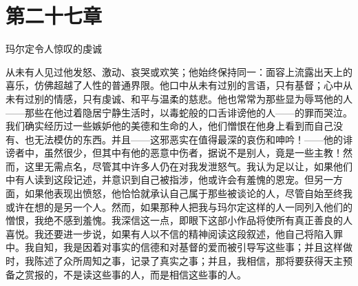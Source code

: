 
\section{第二十七章}

玛尔定令人惊叹的虔诚\par

从未有人见过他发怒、激动、哀哭或欢笑；他始终保持同一：面容上流露出天上的喜乐，仿佛超越了人性的普通界限。他口中从未有过别的言语，只有基督；心中从未有过别的情感，只有虔诚、和平与温柔的慈悲。他也常常为那些显为辱骂他的人——那些在他过着隐居宁静生活时，以毒蛇般的口舌诽谤他的人——的罪而哭泣。我们确实经历过一些嫉妒他的美德和生命的人，他们憎恨在他身上看到而自己没有、也无法模仿的东西。并且——这邪恶实在值得最深的哀伤和呻吟！——他的诽谤者中，虽然很少，但其中有他的恶意中伤者，据说不是别人，竟是一些主教！然而，这里无需点名，尽管其中许多人仍在对我发泄怒气。我认为足以让，如果他们中有人读到这段记述，并意识到自己被指涉，他或许会有羞愧的恩宠。但另一方面，如果他表现出愤怒，他恰恰就承认自己属于那些被谈论的人，尽管自始至终我或许在想的是另一个人。然而，如果那种人把我与玛尔定这样的人一同列入他们的憎恨，我绝不感到羞愧。我深信这一点，即眼下这部小作品将使所有真正善良的人喜悦。我还要进一步说，如果有人以不信的精神阅读这段叙述，他自己将陷入罪中。我自知，我是因着对事实的信德和对基督的爱而被引导写这些事；并且这样做时，我陈述了众所周知之事，记录了真实之事；并且，我相信，那将要获得天主预备之赏报的，不是读这些事的人，而是相信这些事的人。\par

